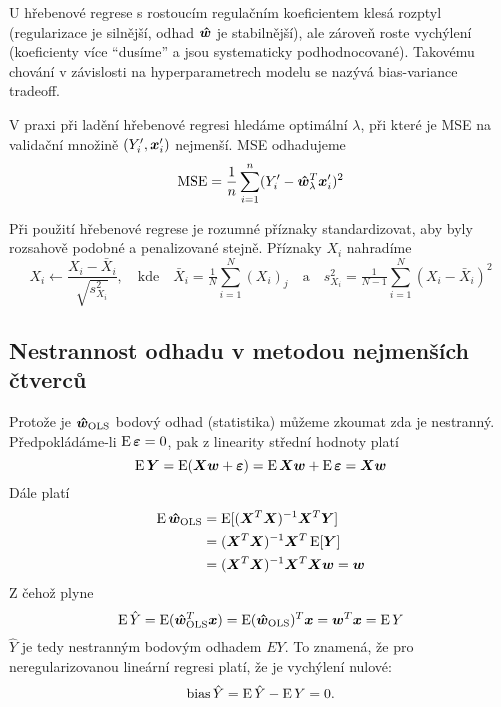 \documentclass[../main.tex]{subfiles}
\begin{document}
U hřebenové regrese s rostoucím regulačním koeficientem klesá rozptyl (regularizace je silnější, odhad $\bm{\hat{w}}$ je stabilnější), ale zároveň roste vychýlení (koeficienty více ``dusíme'' a jsou systematicky podhodnocované). Takovému chování v závislosti na hyperparametrech modelu se nazývá bias-variance tradeoff.

V praxi při ladění hřebenové regresi hledáme optimální $\lambda$, při které je MSE na validační množině $(Y'_i, \bm{x}'_i)$ nejmenší. MSE odhadujeme
\[\operatorname{MSE} = \frac{1}{n} \sum_{i=1}^{n} (Y'_i - \bm{\hat{w}}_\lambda^T\bm{x}'_i)^2\]

Při použití hřebenové regrese je rozumné příznaky standardizovat, aby byly rozsahově podobné a penalizované stejně. Příznaky $X_i$ nahradíme
\[
    X_i \leftarrow \frac{X_i - \bar{X}_i}{\sqrt{s_{X_i}^2}},
    \quad \text{kde} \quad
    \bar{X}_i = \tfrac{1}{N} \sum_{i=1}^{N} (X_i)_j
    \quad \text{a} \quad
    s_{X_i}^2 = \tfrac{1}{N-1} \sum_{i=1}^{N} (X_i - \bar{X}_i)^2
\]

\subsection{Nestrannost odhadu v metodou nejmenších čtverců}

Protože je $\bm{\hat{w}}_{\text{OLS}}$ bodový odhad (statistika) můžeme zkoumat zda je nestranný. Předpokládáme-li $\operatorname{E} \bm{\varepsilon} = 0$, pak z linearity střední hodnoty platí
\[
    \operatorname{E} \bm{Y} = \operatorname{E}(\bm{X}\bm{w} + \bm{\varepsilon})
    = \operatorname{E}\bm{X}\bm{w} + \operatorname{E}\bm{\varepsilon}
    = \bm{X}\bm{w}
\]
Dále platí
\begin{align*}
    \operatorname{E}\bm{\hat{w}}_{\text{OLS}}
     & = \operatorname{E}[(\bm{X}^T\bm{X})^{-1}\bm{X}^T\bm{Y}]      \\
     & = (\bm{X}^T\bm{X})^{-1}\bm{X}^T\operatorname{E}[\bm{Y}]      \\
     & = (\bm{X}^T\bm{X})^{-1}\bm{X}^T\bm{X}\bm{w} = \bm{w}
\end{align*}
Z čehož plyne
\[
    \operatorname{E} \hat{Y} = \operatorname{E}(\bm{\hat{w}}_{\text{OLS}}^T\bm{x}) = \operatorname{E}(\bm{\hat{w}}_{\text{OLS}})^T\bm{x} = \bm{w}^T\bm{x} = \operatorname{E} Y
\]
$\hat{Y}$ je tedy nestranným bodovým odhadem $EY$. To znamená, že pro neregularizovanou lineární regresi platí, že je vychýlení nulové:
\[\text{bias}\,\hat{Y} = \operatorname{E}\hat{Y} - \operatorname{E} Y = 0.\]
\end{document}
